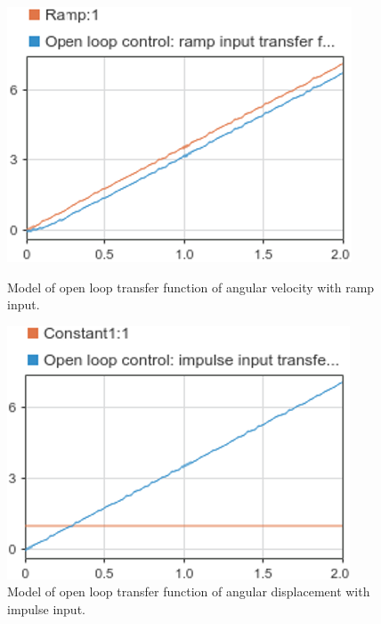 \documentclass[conference]{IEEEtran}
\begin{document}
\begin{figure}[htbp]
    \centering
    \begin{minipage}[b]{0.24\textwidth}
      \includegraphics[width=\textwidth]{../img/q1-5.png}
      \caption{Model of open loop transfer function of angular velocity with ramp input.}
    \end{minipage}
    \hfill
    \begin{minipage}[b]{0.24\textwidth}
      \includegraphics[width=\textwidth]{../img/q1-7.png}
      \caption{Model of open loop transfer function of angular displacement with impulse input.}
      \label{oltad1}
    \end{minipage}
\end{figure}
\end{document}
